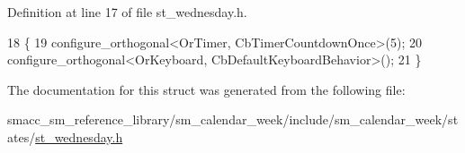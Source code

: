 Definition at line 17 of file st\+\_\+wednesday.\+h.


\begin{DoxyCode}
18     \{
19         configure\_orthogonal<OrTimer,  CbTimerCountdownOnce>(5);    
20         configure\_orthogonal<OrKeyboard, CbDefaultKeyboardBehavior>();
21     \}
\end{DoxyCode}


The documentation for this struct was generated from the following file\+:\begin{DoxyCompactItemize}
\item 
smacc\+\_\+sm\+\_\+reference\+\_\+library/sm\+\_\+calendar\+\_\+week/include/sm\+\_\+calendar\+\_\+week/states/\hyperlink{st__wednesday_8h}{st\+\_\+wednesday.\+h}\end{DoxyCompactItemize}
